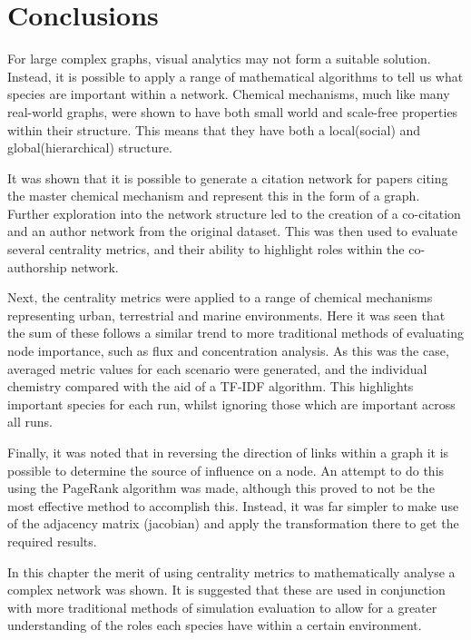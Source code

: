 
\section{Conclusions}
For large complex graphs, visual analytics may not form a suitable solution. Instead, it is possible to apply a range of mathematical algorithms to tell us what species are important within a network. Chemical mechanisms, much like many real-world graphs, were shown to have both small world and scale-free properties within their structure. This means that they have both a local(social) and global(hierarchical) structure. 

It was shown that it is possible to generate a citation network for papers citing the master chemical mechanism and represent this in the form of a graph. Further exploration into the network structure led to the creation of a co-citation and an author network from the original dataset. This was then used to evaluate several centrality metrics, and their ability to highlight roles within the co-authorship network. 

Next, the centrality metrics were applied to a range of chemical mechanisms representing urban, terrestrial and marine environments. Here it was seen that the sum of these follows a similar trend to more traditional methods of evaluating node importance, such as flux and concentration analysis. As this was the case, averaged metric values for each scenario were generated, and the individual chemistry compared with the aid of a TF-IDF algorithm. This highlights important species for each run, whilst ignoring those which are important across all runs.

Finally, it was noted that in reversing the direction of links within a graph it is possible to determine the source of influence on a node. An attempt to do this using the PageRank algorithm was made, although this proved to not be the most effective method to accomplish this. Instead, it was far simpler to make use of the adjacency matrix (jacobian) and apply the transformation there to get the required results. 

In this chapter the merit of using centrality metrics to mathematically analyse a complex network was shown. It is suggested that these are used in conjunction with more traditional methods of simulation evaluation to allow for a greater understanding of the roles each species have within a certain environment. 


